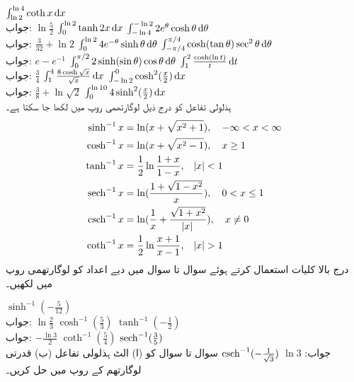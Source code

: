 $\int_{\ln 2}^{\ln 4}\coth x\dif x$\\
جواب:\quad
$\ln\tfrac{5}{2}$
$\int_0^{\ln 2}\tanh 2x\dif x$
$\int_{-\ln 4}^{-\ln 2}2e^{\theta}\cosh \theta\dif \theta$\\
جواب:\quad
$\tfrac{3}{32}+\ln 2$
$\int_0^{\ln 2}4e^{-\theta}\sinh\theta\dif\theta$
$\int_{-\pi/4}^{\pi/4}\cosh(\tan\theta)\sec^2\theta\dif\theta$\\
جواب:\quad
$e-e^{-1}$
$\int_0^{\pi/2}2\sinh(\sin\theta)\cos\theta\dif\theta$
$\int_1^2\tfrac{\cosh(\ln t)}{t}\dif t$\\
جواب:\quad
$\tfrac{3}{4}$
$\int_1^4\tfrac{8\cosh \sqrt{x}}{\sqrt{x}}\dif x$
$\int_{-\ln 2}^0\cosh^2(\tfrac{x}{2})\dif x$\\
جواب:\quad
$\tfrac{3}{8}+\ln\sqrt{2}$
$\int_0^{\ln 10}4\sinh^2(\tfrac{x}{2})\dif x$
\\
ہذلولی تفاعل کو درج ذیل لوگارتھمی روپ میں لکھا جا سکتا ہے۔
\begin{align*}
\sinh^{-1}x&=\ln(x+\sqrt{x^2+1}),\quad -\infty<x<\infty\\
\cosh^{-1}x&=\ln(x+\sqrt{x^2-1}),\quad x\ge 1\\
\tanh^{-1}x&=\frac{1}{2}\ln\frac{1+x}{1-x},\quad \abs{x}<1\\
\operatorname{sech}^{-1}x&=\ln(\frac{1+\sqrt{1-x^2}}{x}),\quad 0<x\le 1\\
\operatorname{csch}^{-1}x&=\ln(\frac{1}{x}+\frac{\sqrt{1+x^2}}{\abs{x}}),\quad x\ne 0\\
\coth^{-1}x&=\frac{1}{2}\ln\frac{x+1}{x-1},\quad \abs{x}>1
\end{align*}
درج بالا کلیات استعمال کرتے ہوئے سوال  تا سوال  میں دیے اعداد  کو لوگارتھمی روپ میں لکھیں۔


$\sinh^{-1}(-\tfrac{5}{12})$\\
جواب:\quad
$\ln\tfrac{2}{3}$
$\cosh^{-1}(\tfrac{5}{3})$
$\tanh^{-1}(-\tfrac{1}{2})$\\
جواب:\quad
$-\tfrac{\ln 3}{2}$
$\coth^{-1}(\tfrac{5}{4})$
$\operatorname{sech}^{-1}(\tfrac{3}{5})$\\
جواب:\quad
$\ln 3$
$\operatorname{csch}^{-1}(-\tfrac{1}{\sqrt{3}})$
سوال  تا سوال  کو (ا) الٹ ہذلولی تفاعل (ب) قدرتی لوگارتھم کے روپ میں حل کریں۔

